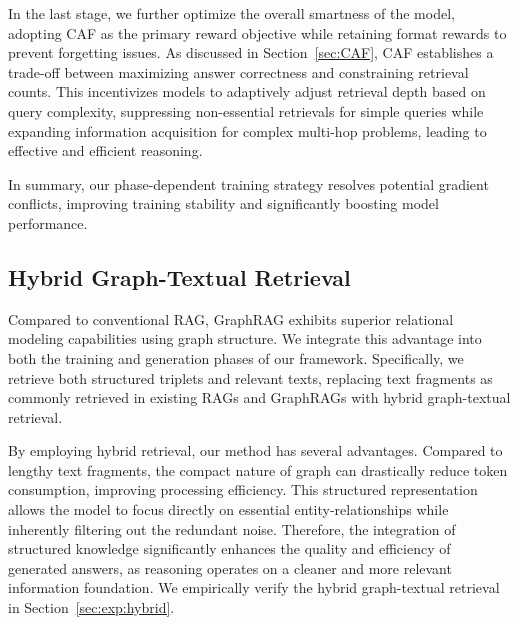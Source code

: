 In the last stage, we further optimize the overall smartness of the model, adopting CAF as the primary reward objective while retaining format rewards to prevent forgetting issues. As discussed in Section~\ref{sec:CAF}, CAF establishes a trade-off between maximizing answer correctness and constraining retrieval counts. This incentivizes models to adaptively adjust retrieval depth based on query complexity, suppressing non-essential retrievals for simple queries while expanding information acquisition for complex multi-hop problems, leading to effective and efficient reasoning. 

In summary, our phase-dependent training strategy resolves potential gradient conflicts, %
improving training stability and significantly boosting model performance. 

\subsection{Hybrid Graph-Textual Retrieval}
Compared to conventional RAG, GraphRAG exhibits superior relational modeling capabilities using graph structure. %
We integrate this advantage into both the training and generation phases of our framework. %
Specifically, we retrieve both structured triplets and relevant texts, replacing text fragments as commonly retrieved in existing RAGs and GraphRAGs with hybrid graph-textual retrieval.

By employing hybrid retrieval, our method has several advantages. 
Compared to lengthy text fragments, the compact nature of graph can drastically reduce token consumption, improving processing efficiency. 
This structured representation
allows the model to focus directly on essential entity-relationships while inherently filtering out the redundant noise. 
Therefore, the integration of structured knowledge significantly enhances the quality and efficiency of generated answers, as reasoning operates on a cleaner and more relevant information foundation. We empirically verify the hybrid graph-textual retrieval in Section~\ref{sec:exp:hybrid}.

